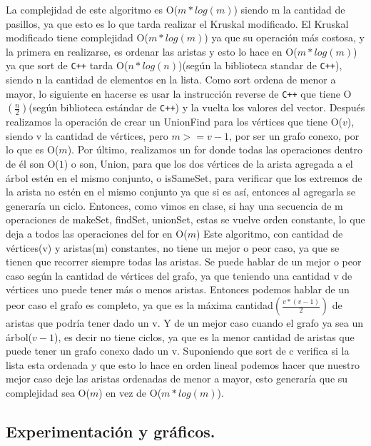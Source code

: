 La complejidad de este algoritmo es O($m*log(m)$) siendo m la cantidad de pasillos, ya que esto es lo que tarda realizar el Kruskal modificado.\newline
 El Kruskal modificado tiene complejidad O($m*log(m)$) ya que su  operación más costosa, y la primera en realizarse, es ordenar las aristas y esto lo hace en O($m*log(m)$) ya que sort de \verb-C++- tarda O($n*log(n)$)(según la biblioteca standar de \verb-C++-), siendo n la cantidad de elementos en la lista. Como sort ordena de menor a mayor, lo siguiente en hacerse es usar la instrucción reverse de \verb-C++- que tiene O$\left(\displaystyle\frac{n}{2}\right)$(según biblioteca estándar de \verb-C++-) y la vuelta los valores del vector. Después realizamos la operación de crear un UnionFind para los vértices que tiene O($v$), siendo v la cantidad de vértices, pero $m>=v-1$, por ser un grafo conexo, por lo que es O($m$). Por último, realizamos un for donde todas las operaciones dentro de él son O($1$) o son, Union, para que los dos vértices de la arista agregada a el árbol estén en el mismo conjunto, o isSameSet, para verificar que los extremos de la arista no estén en el mismo conjunto ya que si es así, entonces al agregarla se generaría un ciclo. Entonces, como vimos en clase, si hay una secuencia de m operaciones de makeSet, findSet, unionSet, estas se vuelve orden constante, lo que deja a todos las operaciones del for en O($m$)\newline
 Este algoritmo, con cantidad de vértices(v) y aristas(m) constantes, no tiene un mejor o peor caso, ya que se tienen que recorrer siempre todas las aristas. Se puede hablar de un mejor o peor caso según la cantidad de vértices del grafo, ya que teniendo una cantidad v de vértices uno puede tener más o menos aristas. Entonces podemos hablar de un peor caso el grafo es completo, ya que es la máxima cantidad$\left(\displaystyle\frac{v*(v-1)}{2}\right)$ de aristas que podría tener dado un v. Y de un mejor caso cuando el grafo ya sea un árbol($v-1$), es decir no tiene ciclos, ya que es la menor cantidad de aristas que puede tener un grafo conexo dado un v. Suponiendo que sort de c verifica si la lista esta ordenada y que esto lo hace en orden lineal podemos hacer que nuestro mejor caso deje las aristas ordenadas de menor a mayor, esto generaría que su complejidad sea O($m$) en vez de O($m*log(m)$).

\subsection{Experimentación y gráficos.}

